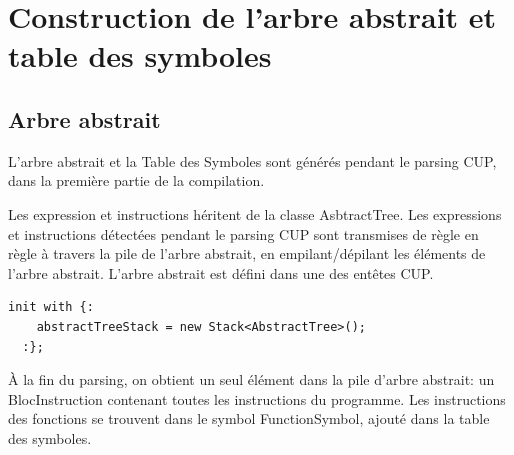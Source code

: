 \documentclass[11pt,a4paper]{article}
\begin{document}
   
   \section{Construction de l'arbre abstrait et table des symboles}
   
   \subsection{Arbre abstrait}
   
   \par L'arbre abstrait et la Table des Symboles sont générés pendant le parsing CUP, dans la première partie de la compilation. 
   
   \par Les expression et instructions héritent de la classe AsbtractTree. Les expressions et instructions détectées pendant le parsing CUP sont transmises de règle en règle à travers la pile de l'arbre abstrait, en empilant/dépilant les éléments de l'arbre abstrait. L'arbre abstrait est défini dans une des entêtes CUP.
   
   \begin{lstlisting}[caption={Déclaration de la pile de l'arbre abstrait}]
  init with {:
    abstractTreeStack = new Stack<AbstractTree>();
  :};
  \end{lstlisting}
  
  \par À la fin du parsing, on obtient un seul élément dans la pile d'arbre abstrait: un BlocInstruction contenant toutes les instructions du programme. Les instructions des fonctions se trouvent dans le symbol FunctionSymbol, ajouté dans la table des symboles. 
  
\end{document}

